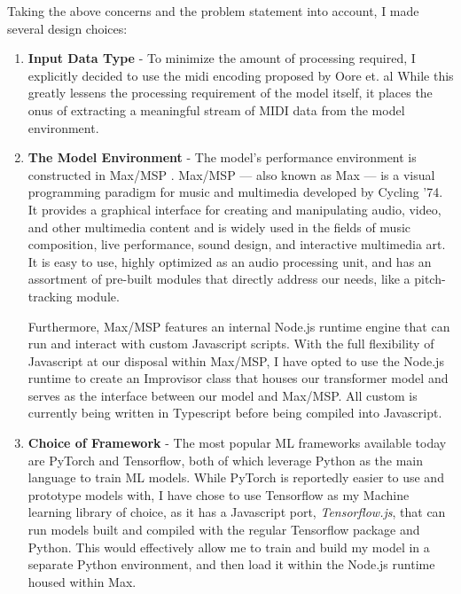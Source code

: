 \documentclass[../main.tex]{subfiles}
\begin{document}
Taking the above concerns and the problem statement into account, I made several design choices:

\begin{enumerate}

    \item\textbf{Input Data Type} - To minimize the amount of processing required, I explicitly decided to use the midi encoding proposed by Oore et. al\cite{oore:1} While this greatly lessens the processing requirement of the model itself, it places the onus of extracting a meaningful stream of MIDI data from the model environment.

    \item \textbf{The Model Environment} - The model's performance environment is constructed in Max/MSP \cite{max/msp}. Max/MSP — also known as Max — is a visual programming paradigm for music and multimedia developed by Cycling '74. It provides a graphical interface for creating and manipulating audio, video, and other multimedia content and is widely used in the fields of music composition, live performance, sound design, and interactive multimedia art. It is easy to use, highly optimized as an audio processing unit, and has an assortment of pre-built modules that directly address our needs, like a pitch-tracking module. 

    Furthermore, Max/MSP features an internal Node.js runtime engine that can run and interact with custom Javascript scripts. With the full flexibility of Javascript at our disposal within Max/MSP, I have opted to use the Node.js runtime to create an Improvisor class that houses our transformer model and serves as the interface between our model and Max/MSP. All custom is currently being written in Typescript before being compiled into Javascript.

    \item \textbf{Choice of Framework} - The most popular ML frameworks available today are PyTorch and Tensorflow, both of which leverage Python as the main language to train ML models. While PyTorch is reportedly easier to use and prototype models with, I have chose to use Tensorflow as my Machine learning library of choice, as it has a Javascript port, \textit{Tensorflow.js}, that can run models built and compiled with the regular Tensorflow package and Python. This would effectively allow me to train and build my model in a separate Python environment, and then load it within the Node.js runtime housed within Max.
\end{enumerate}
\end{document}
